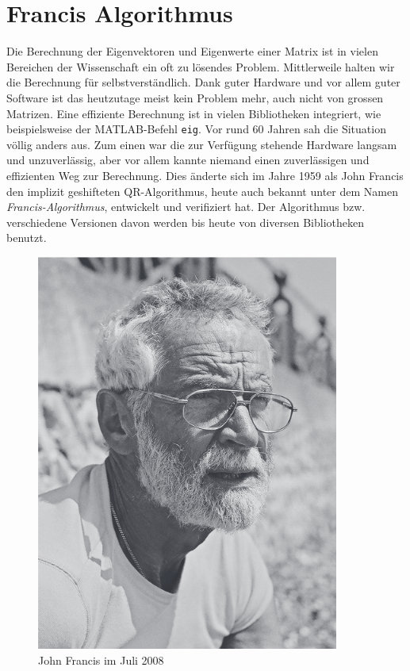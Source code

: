 \newcommand{\norm}[1]{\left\lVert#1\right\rVert}


\chapter{Francis Algorithmus\label{chapter:francis}}
\begin{refsection}
Die Berechnung der Eigenvektoren und Eigenwerte einer Matrix ist in vielen Bereichen der Wissenschaft ein oft zu lösendes Problem.
Mittlerweile halten wir die Berechnung für selbstverständlich.
Dank guter Hardware und vor allem guter Software ist das heutzutage meist kein Problem mehr, auch nicht von grossen Matrizen.
Eine effiziente Berechnung ist in vielen Bibliotheken integriert, wie beispielsweise der MATLAB-Befehl \texttt{eig}.
Vor rund 60 Jahren sah die Situation völlig anders aus.
Zum einen war die zur Verfügung stehende Hardware langsam und unzuverlässig, aber vor allem kannte niemand einen zuverlässigen und effizienten Weg zur Berechnung.
Dies änderte sich im Jahre 1959 als John Francis den implizit geshifteten QR-Algorithmus, heute auch bekannt unter dem Namen \emph{Francis-Algorithmus}, entwickelt und verifiziert hat.
Der Algorithmus bzw. verschiedene Versionen davon werden bis heute von diversen Bibliotheken benutzt. \cite{francis:watkins_paper}

\begin{figure}[h]
	\begin{center}
		\includegraphics[scale=0.5]{papers/francis/images/Francis.png}
		\caption{John Francis im Juli 2008 \cite{francis:francis_portrait}}
		\label{John Francis}
	\end{center}
\end{figure}



\end{refsection}

